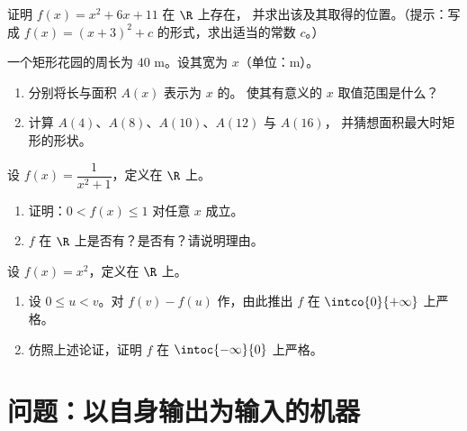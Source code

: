 \begin{exercise}[$\star\star$]\label{exo:g10:functions:7}
证明 $f(x) = x^2 + 6x + 11$ 在 $\R$ 上存在，
并求出该及其取得的位置。（提示：写成
$f(x) = (x + 3)^2 + c$ 的形式，求出适当的常数 $c$。）
\end{exercise}

\begin{exercise}[$\star\star$]\label{exo:g10:functions:8}
一个矩形花园的周长为 $40$ m。设其宽为
$x$（单位：m）。
\begin{enumerate}
  \item 分别将长与面积 $A(x)$ 表示为 $x$ 的。
        使其有意义的 $x$ 取值范围是什么？
  \item 计算 $A(4)$、$A(8)$、$A(10)$、$A(12)$ 与 $A(16)$，
        并猜想面积最大时矩形的形状。
\end{enumerate}
\end{exercise}

\begin{exercise}[$\star\star$]\label{exo:g10:functions:9}
设 $f(x) = \dfrac{1}{x^2 + 1}$，定义在 $\R$ 上。
\begin{enumerate}
  \item 证明：$0 < f(x) \leq 1$ 对任意 $x$ 成立。
  \item $f$ 在 $\R$ 上是否有？是否有？请说明理由。
\end{enumerate}
\end{exercise}

\begin{exercise}[$\star\star\star$]\label{exo:g10:functions:10}
设 $f(x) = x^2$，定义在 $\R$ 上。
\begin{enumerate}
  \item 设 $0 \leq u < v$。对 $f(v) - f(u)$ 作，由此推出 $f$ 在
        $\intco{0}{+\infty}$ 上严格。
  \item 仿照上述论证，证明 $f$ 在
        $\intoc{-\infty}{0}$ 上严格。
\end{enumerate}
\end{exercise}

\section{问题：以自身输出为输入的机器}

